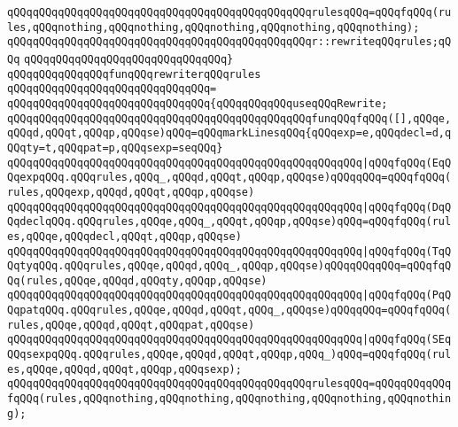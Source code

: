 \newline
\verb|qQQqqQQqqQQqqQQqqQQqqQQqqQQqqQQqqQQqqQQqqQQqqQQqrulesqQQq=qQQqfqQQq(rules,qQQqnothing,qQQqnothing,qQQqnothing,qQQqnothing,qQQqnothing);|\newline
\newline
\verb|qQQqqQQqqQQqqQQqqQQqqQQqqQQqqQQqqQQqqQQqqQQqqQQqr::rewriteqQQqrules;qQQq|\newline
\verb|qQQqqQQqqQQqqQQqqQQqqQQqqQQqqQQq}|\newline
\newline
\verb|qQQqqQQqqQQqqQQqfunqQQqrewriterqQQqrules|\newline
\verb|qQQqqQQqqQQqqQQqqQQqqQQqqQQqqQQq=|\newline
\verb|qQQqqQQqqQQqqQQqqQQqqQQqqQQqqQQq{qQQqqQQqqQQquseqQQqRewrite;|\newline
\newline
\verb|qQQqqQQqqQQqqQQqqQQqqQQqqQQqqQQqqQQqqQQqqQQqqQQqfunqQQqfqQQq([],qQQqe,qQQqd,qQQqt,qQQqp,qQQqse)qQQq=qQQqmarkLinesqQQq{qQQqexp=e,qQQqdecl=d,qQQqty=t,qQQqpat=p,qQQqsexp=seqQQq}|\newline
\verb|qQQqqQQqqQQqqQQqqQQqqQQqqQQqqQQqqQQqqQQqqQQqqQQqqQQqqQQq|\verb#|qQQqfqQQq(EqQQqexpqQQq.qQQqrules,qQQq_,qQQqd,qQQqt,qQQqp,qQQqse)qQQqqQQq=qQQqfqQQq(rules,qQQqexp,qQQqd,qQQqt,qQQqp,qQQqse)#\newline
\verb|qQQqqQQqqQQqqQQqqQQqqQQqqQQqqQQqqQQqqQQqqQQqqQQqqQQqqQQq|\verb#|qQQqfqQQq(DqQQqdeclqQQq.qQQqrules,qQQqe,qQQq_,qQQqt,qQQqp,qQQqse)qQQq=qQQqfqQQq(rules,qQQqe,qQQqdecl,qQQqt,qQQqp,qQQqse)#\newline
\verb|qQQqqQQqqQQqqQQqqQQqqQQqqQQqqQQqqQQqqQQqqQQqqQQqqQQqqQQq|\verb#|qQQqfqQQq(TqQQqtyqQQq.qQQqrules,qQQqe,qQQqd,qQQq_,qQQqp,qQQqse)qQQqqQQqqQQq=qQQqfqQQq(rules,qQQqe,qQQqd,qQQqty,qQQqp,qQQqse)#\newline
\verb|qQQqqQQqqQQqqQQqqQQqqQQqqQQqqQQqqQQqqQQqqQQqqQQqqQQqqQQq|\verb#|qQQqfqQQq(PqQQqpatqQQq.qQQqrules,qQQqe,qQQqd,qQQqt,qQQq_,qQQqse)qQQqqQQq=qQQqfqQQq(rules,qQQqe,qQQqd,qQQqt,qQQqpat,qQQqse)#\newline
\verb|qQQqqQQqqQQqqQQqqQQqqQQqqQQqqQQqqQQqqQQqqQQqqQQqqQQqqQQq|\verb#|qQQqfqQQq(SEqQQqsexpqQQq.qQQqrules,qQQqe,qQQqd,qQQqt,qQQqp,qQQq_)qQQq=qQQqfqQQq(rules,qQQqe,qQQqd,qQQqt,qQQqp,qQQqsexp);#\newline
\newline
\verb|qQQqqQQqqQQqqQQqqQQqqQQqqQQqqQQqqQQqqQQqqQQqqQQqrulesqQQq=qQQqqQQqqQQqfqQQq(rules,qQQqnothing,qQQqnothing,qQQqnothing,qQQqnothing,qQQqnothing);|\newline
\newline
